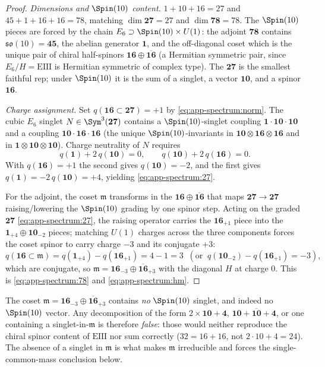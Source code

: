 \begin{proof}
\emph{Dimensions and $\Spin(10)$ content.}
$1+10+16=27$ and $45+1+16+16=78$, matching $\dim\mathbf{27}=27$ and
$\dim\mathbf{78}=78$. The $\Spin(10)$ pieces are forced by the chain
$E_6\supset\Spin(10)\times U(1)$: the adjoint $\mathbf{78}$ contains
$\mathfrak{so}(10)=\mathbf{45}$, the abelian generator $\mathbf{1}$, and
the off-diagonal coset which is the unique pair of chiral half-spinors
$\mathbf{16}\oplus\overline{\mathbf{16}}$ (a Hermitian symmetric pair,
since $E_6/H=\mathrm{EIII}$ is Hermitian symmetric of complex type). The
$\mathbf{27}$ is the smallest faithful rep; under $\Spin(10)$ it is the
sum of a singlet, a vector $\mathbf{10}$, and a spinor $\mathbf{16}$.

\emph{Charge assignment.} Set $q(\mathbf{16}\subset\mathbf{27})=+1$ by
\eqref{eq:app-spectrum:norm}. The cubic $E_6$ singlet
$N\in\Sym^3(\mathbf{27})$ contains a $\Spin(10)$-singlet coupling
$\mathbf{1}\cdot\mathbf{10}\cdot\mathbf{10}$ and a coupling
$\mathbf{10}\cdot\mathbf{16}\cdot\mathbf{16}$ (the unique
$\Spin(10)$-invariants in $\mathbf{10}\otimes\mathbf{16}\otimes\mathbf{16}$
and in $\mathbf{1}\otimes\mathbf{10}\otimes\mathbf{10}$). Charge
neutrality of $N$ requires
\[
  q(\mathbf 1)+2\,q(\mathbf{10})=0,
  \qquad
  q(\mathbf{10})+2\,q(\mathbf{16})=0 .
\]
With $q(\mathbf{16})=+1$ the second gives $q(\mathbf{10})=-2$, and the
first gives $q(\mathbf 1)=-2\,q(\mathbf{10})=+4$, yielding
\eqref{eq:app-spectrum:27}.

For the adjoint, the coset $\mathfrak m$ transforms in the
$\mathbf{16}\oplus\overline{\mathbf{16}}$ that maps
$\mathbf{27}\to\mathbf{27}$ raising/lowering the $\Spin(10)$ grading by
one spinor step. Acting on the graded $\mathbf{27}$
\eqref{eq:app-spectrum:27}, the raising operator carries the
$\mathbf{16}_{+1}$ piece into the $\mathbf{1}_{+4}\oplus\mathbf{10}_{-2}$
pieces; matching $U(1)$ charges across the three components forces the
coset spinor to carry charge $-3$ and its conjugate $+3$:
\[
  q(\mathbf{16}\subset\mathfrak m)
   = q(\mathbf{1}_{+4})-q(\mathbf{16}_{+1}) = 4-1 = 3
   \;\;(\text{or}\;\; q(\mathbf{10}_{-2})-q(\mathbf{16}_{+1})=-3),
\]
which are conjugate, so $\mathfrak m=\mathbf{16}_{-3}\oplus
\overline{\mathbf{16}}_{+3}$ with the diagonal $H$ at charge $0$. This is
\eqref{eq:app-spectrum:78} and \eqref{eq:app-spectrum:hm}.
\end{proof}

\begin{remark}\label{rem:app-spectrum:nosinglet}
The coset $\mathfrak m=\mathbf{16}_{-3}\oplus\overline{\mathbf{16}}_{+3}$
contains \emph{no} $\Spin(10)$ singlet, and indeed no $\Spin(10)$ vector.
Any decomposition of the form $2\times\mathbf{10}+\mathbf 4$,
$\mathbf{10}+\overline{\mathbf{10}}+\mathbf 4$, or one containing a
singlet-in-$\mathfrak m$ is therefore \emph{false}: those would neither
reproduce the chiral spinor content of $\mathrm{EIII}$ nor sum correctly
($32=16+16$, not $2\cdot10+4=24$). The absence of a singlet in
$\mathfrak m$ is what makes $\mathfrak m$ irreducible and forces the
single-common-mass conclusion below.
\end{remark}

